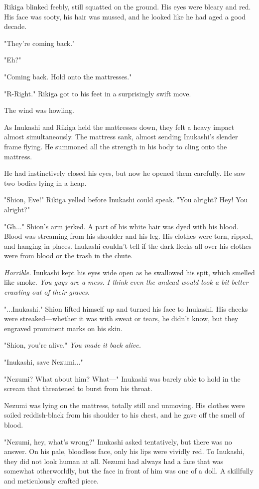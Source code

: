 Rikiga blinked feebly, still squatted on the ground. His eyes were
bleary and red. His face was sooty, his hair was mussed, and he looked
like he had aged a good decade.

"They're coming back."

"Eh?"

"Coming back. Hold onto the mattresses."

"R-Right." Rikiga got to his feet in a surprisingly swift move.

The wind was howling.

As Inukashi and Rikiga held the mattresses down, they felt a heavy
impact almost simultaneously. The mattress sank, almost sending
Inukashi's slender frame flying. He summoned all the strength in his
body to cling onto the mattress.

He had instinctively closed his eyes, but now he opened them carefully.
He saw two bodies lying in a heap.

"Shion, Eve!" Rikiga yelled before Inukashi could speak. "You alright?
Hey! You alright?"

"Gh..." Shion's arm jerked. A part of his white hair was dyed with his
blood. Blood was streaming from his shoulder and his leg. His clothes
were torn, ripped, and hanging in places. Inukashi couldn't tell if the
dark flecks all over his clothes were from blood or the trash in the
chute.

\emph{Horrible.} Inukashi kept his eyes wide open as he swallowed his spit,
which smelled like smoke. \emph{You guys are a mess. I think even the undead
would look a bit better crawling out of their graves.}

"...Inukashi." Shion lifted himself up and turned his face to Inukashi.
His cheeks were streaked---whether it was with sweat or tears, he didn't
know, but they engraved prominent marks on his skin.

"Shion, you're alive." \emph{You made it back alive.}

"Inukashi, save Nezumi..."

"Nezumi? What about him? What---" Inukashi was barely able to hold in the
scream that threatened to burst from his throat.

Nezumi was lying on the mattress, totally still and unmoving. His
clothes were soiled reddish-black from his shoulder to his chest, and he
gave off the smell of blood.

"Nezumi, hey, what's wrong?" Inukashi asked tentatively, but there was
no answer. On his pale, bloodless face, only his lips were vividly red.
To Inukashi, they did not look human at all. Nezumi had always had a
face that was somewhat otherworldly, but the face in front of him was
one of a doll. A skillfully and meticulously crafted piece.

